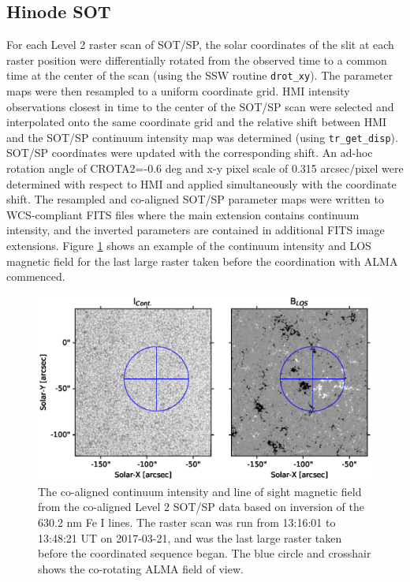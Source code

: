 \documentclass[twocolumn]{aastex62}
\begin{document}
\subsection{Hinode SOT}

For each Level 2 raster scan of SOT/SP, the solar coordinates of the slit at each raster position were differentially rotated from the observed time to a common time at the center of the scan (using the SSW routine \verb+drot_xy+).  The parameter maps were then resampled to a uniform coordinate grid.  HMI intensity observations closest in time to the center of the SOT/SP scan were selected and interpolated onto the same coordinate grid and the relative shift between HMI and the SOT/SP continuum intensity map was determined (using \verb+tr_get_disp+).  SOT/SP coordinates were updated with the corresponding shift.  An ad-hoc rotation angle of CROTA2=-0.6 deg and x-y pixel scale of 0.315 arcsec/pixel were determined with respect to HMI and applied simultaneously with the coordinate shift.  The resampled and co-aligned SOT/SP parameter maps were written to WCS-compliant FITS files where the main extension contains continuum intensity, and the inverted parameters are contained in additional FITS image extensions.  Figure \ref{fig:SOTSP} shows an example of the continuum intensity and LOS magnetic field for the last large raster taken before the coordination with ALMA commenced.

\begin{figure}
    \begin{center}
        \includegraphics[width=7in]{./figures/SOTSP_example.eps}
    \end{center}
    \caption{The co-aligned continuum intensity and line of sight magnetic field from the co-aligned Level 2 SOT/SP data based on inversion of the 630.2 nm Fe I lines.  The raster scan was run from 13:16:01 to 13:48:21 UT on 2017-03-21, and was the last large raster taken before the coordinated sequence began.  The blue circle and crosshair shows the co-rotating ALMA field of view.}
    \label{fig:SOTSP}
\end{figure}
\end{document}
